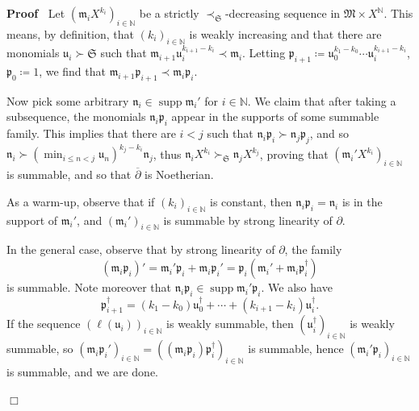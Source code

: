 \documentclass[10pt,a4paper]{amsart}
\newcommand{\assign}{\coloneqq}
\newenvironment{proof}{\noindent\textbf{Proof\ }}{\hspace*{\fill}$\Box$\medskip}
\newcommand{\tmop}[1]{\ensuremath{\operatorname{#1}}}
\begin{document}
\begin{proof}
  Let $(\mathfrak{m}_i X^{k_i})_{i \in \mathbb{N}}$ be a strictly
  $\prec_{\mathfrak{S}}$-decreasing sequence in $\mathfrak{M} \times
  X^{\mathbb{N}}$. This means, by definition, that $(k_i)_{i \in \mathbb{N}}$
  is weakly increasing and that there are monomials $\mathfrak{u}_i \succ
  \mathfrak{S}$ such that $\mathfrak{m}_{i + 1} \mathfrak{u}_i^{k_{i + 1} -
  k_i} \prec \mathfrak{m}_i$. Letting $\mathfrak{p}_{i + 1} \assign
  \mathfrak{u}_0^{k_1 - k_0} \cdots \mathfrak{u}_i^{k_{i + 1} - k_i}$,
  $\mathfrak{p}_0 \assign 1$, we find that $\mathfrak{m}_{i + 1}
  \mathfrak{p}_{i + 1} \prec \mathfrak{m}_i \mathfrak{p}_i$.
  
  Now pick some arbitrary $\mathfrak{n}_i \in \tmop{supp} \mathfrak{m}_i'$ for
  $i \in \mathbb{N}$. We claim that after taking a subsequence, the monomials
  $\mathfrak{n}_i \mathfrak{p}_i$ appear in the supports of some summable
  family. This implies that there are $i < j$ such that $\overset{}{}
  \mathfrak{n}_i \mathfrak{p}_i \succ \mathfrak{n}_j \mathfrak{p}_j$, and so
  $\mathfrak{n}_i \succ (\min_{i \leqslant n < j} \mathfrak{u}_n) ^{k_j - k_i}
  \mathfrak{n}_j$, thus $\mathfrak{n}_i X^{k_i} \succ_{\mathfrak{S}}
  \mathfrak{n}_j X^{k_j}$, proving that $(\mathfrak{m}_i' X^{k_i})_{i \in
  \mathbb{N}}$ is summable, and so that $\overline{\partial}$ is Noetherian.
  
  As a warm-up, observe that if $(k_i)_{i \in \mathbb{N}}$ is constant, then
  $\mathfrak{n}_i \mathfrak{p}_i =\mathfrak{n}_i$ is in the support of
  $\mathfrak{m}_i'$, and $(\mathfrak{m}_i')_{i \in \mathbb{N}}$ is summable by
  strong linearity of $\partial$.
  
  In the general case, observe that by strong linearity of $\partial$, the
  family
  \[ (\mathfrak{m}_i \mathfrak{p}_i)' =\mathfrak{m}_i' \mathfrak{p}_i
     +\mathfrak{m}_i \mathfrak{p}_i' =\mathfrak{p}_i  (\mathfrak{m}_i'
     +\mathfrak{m}_i \mathfrak{p}_i^{\dag}) \]
  is summable. Note moreover that $\mathfrak{n}_i \mathfrak{p}_i \in
  \tmop{supp} \mathfrak{m}_i' \mathfrak{p}_i$. We also have
  \[ \mathfrak{p}_{i + 1}^{\dagger} = (k_1 - k_0) \mathfrak{u}_0^{\dagger} +
     \cdots + (k_{i + 1} - k_i) \mathfrak{u}_i^{\dag} . \]
  If the sequence $(\ell (\mathfrak{u}_i))_{i \in \mathbb{N}}$ is weakly
  summable, then $(\mathfrak{u}_i^{\dagger})_{i \in \mathbb{N}}$ is weakly
  summable, so $ (\mathfrak{m}_i \mathfrak{p}_i')_{i \in \mathbb{N}} =
  ((\mathfrak{m}_i \mathfrak{p}_i) \mathfrak{p}_i^{\dagger})_{i \in
  \mathbb{N}}$ is summable, hence $(\mathfrak{m}_i' \mathfrak{p}_i)_{i \in
  \mathbb{N}}$ is summable, and we are done.
  

\end{proof}
\end{document}
